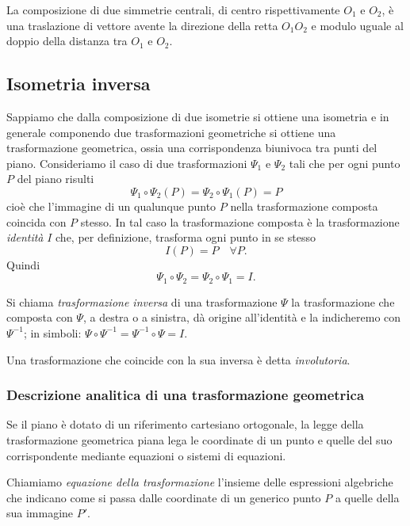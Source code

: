 \begin{proposizione}
La composizione di due simmetrie centrali, di centro rispettivamente 
\(O_1\) e \(O_2\), è una traslazione di vettore avente la direzione della 
retta \(O_1O_2\) e modulo uguale al doppio della distanza tra \(O_1\) e 
\(O_2\).
\end{proposizione}
    
\subsection{Isometria inversa}
      
Sappiamo che dalla composizione di due isometrie si ottiene una 
isometria e in generale componendo due trasformazioni geometriche si 
ottiene una trasformazione geometrica, ossia una corrispondenza 
biunivoca tra punti del piano.
Consideriamo il caso di due trasformazioni \(\Psi_1\) e \(\Psi_2\) tali 
che per ogni punto \(P\) del piano risulti
\[\Psi_1 \circ \Psi_2 (P) = \Psi_2 \circ \Psi_1 (P) = P\]
cioè che l'immagine di un qualunque punto \(P\) nella trasformazione 
composta coincida con \(P\) stesso. In tal caso la trasformazione 
composta è la trasformazione \emph{identità} \(I\) che, per 
definizione, trasforma ogni punto in se stesso
\[I(P) = P\quad \forall P.\]
Quindi
\[\Psi_1 \circ \Psi_2 = \Psi_2 \circ \Psi_1 = I.\]

\begin{definizione}
Si chiama \emph{trasformazione inversa} di una trasformazione \(\Psi\) 
la trasformazione che composta con \(\Psi\), a destra o a sinistra, dà 
origine all'identità e la indicheremo con \(\Psi^{-1}\); in simboli: 
\(\Psi \circ \Psi^{-1} = \Psi^{-1} \circ \Psi = I\).
\end{definizione}
      
\begin{definizione}
Una trasformazione che coincide con la sua inversa è detta 
\emph{involutoria}.
\end{definizione}

\subsubsection{\textbf{Descrizione analitica di una trasformazione geometrica}}
Se il piano è dotato di un riferimento cartesiano ortogonale, la 
legge della trasformazione geometrica piana lega le coordinate di un 
punto e quelle del suo corrispondente mediante equazioni o sistemi di 
equazioni.

\begin{definizione}
  Chiamiamo \emph{equazione della trasformazione} l'insieme delle 
  espressioni algebriche che indicano come si passa dalle coordinate di 
  un generico punto \(P\) a quelle della sua immagine \(P'\).
\end{definizione}

